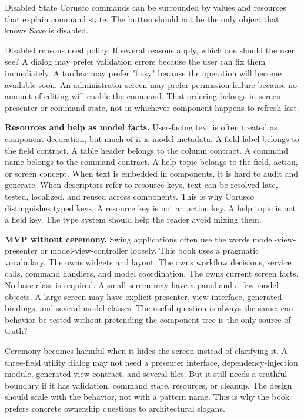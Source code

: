 \begin{coruscobox}{Disabled State}
Corusco commands can be surrounded by values and resources that explain command state. The button should not be the only object that knows Save is disabled.
\end{coruscobox}

Disabled reasons need policy. If several reasons apply, which one should the user see? A dialog may prefer validation errors because the user can fix them immediately. A toolbar may prefer "busy" because the operation will become available soon. An administrator screen may prefer permission failure because no amount of editing will enable the command. That ordering belongs in screen-presenter or command state, not in whichever component happens to refresh last.

\textbf{Resources and help as model facts.} User-facing text is often treated as component decoration, but much of it is model metadata. A field label belongs to the field contract. A table header belongs to the column contract. A command name belongs to the command contract. A help topic belongs to the field, action, or screen concept. When text is embedded in components, it is hard to audit and generate. When descriptors refer to resource keys, text can be resolved late, tested, localized, and reused across components. This is why Corusco distinguishes typed keys. A resource key is not an action key. A help topic is not a field key. The type system should help the reader avoid mixing them.

\textbf{MVP without ceremony.} Swing applications often use the words model-view-presenter or model-view-controller loosely. This book uses a pragmatic vocabulary. The  owns widgets and layout. The  owns workflow decisions, service calls, command handlers, and model coordination. The  owns current screen facts. No base class is required. A small screen may have a panel and a few model objects. A large screen may have explicit presenter, view interface, generated bindings, and several model classes. The useful question is always the same: can behavior be tested without pretending the component tree is the only source of truth?

Ceremony becomes harmful when it hides the screen instead of clarifying it. A three-field utility dialog may not need a presenter interface, dependency-injection module, generated view contract, and several files. But it still needs a truthful boundary if it has validation, command state, resources, or cleanup. The design should scale with the behavior, not with a pattern name. This is why the book prefers concrete ownership questions to architectural slogans.

